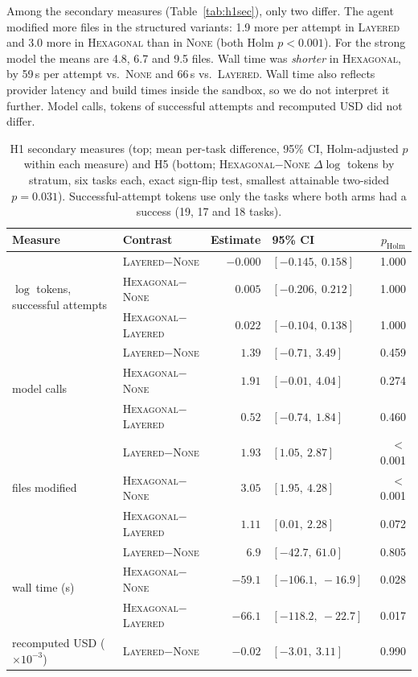 \documentclass[10pt]{article}
\newcommand{\NONE}{\textsc{None}}
\newcommand{\LAY}{\textsc{Layered}}
\newcommand{\HEX}{\textsc{Hexagonal}}
\begin{document}
Among the secondary measures (Table~\ref{tab:h1sec}), only two differ. The agent modified more
files in the structured variants: 1.9 more per attempt in \LAY{} and 3.0 more in \HEX{} than in
\NONE{} (both Holm $p<0.001$). For the strong model the means are 4.8, 6.7 and 9.5 files. Wall
time was \emph{shorter} in \HEX, by 59\,s per attempt vs.\ \NONE{} and 66\,s vs.\ \LAY. Wall time
also reflects provider latency and build times inside the sandbox, so we do not interpret it
further. Model calls, tokens of successful attempts and recomputed USD did not differ.

\begin{table}[tbp]\centering
\caption{H1 secondary measures (top; mean per-task difference, 95\% CI, Holm-adjusted $p$ within
each measure) and H5 (bottom; \HEX$-$\NONE{} $\Delta\log$ tokens by stratum, six tasks each, exact
sign-flip test, smallest attainable two-sided $p=0.031$). Successful-attempt tokens use only the
tasks where both arms had a success (19, 17 and 18 tasks).}
\label{tab:h1sec}\label{tab:h5}
\footnotesize
\begin{tabular}{@{}llrlr@{}}
\toprule
Measure & Contrast & Estimate & 95\% CI & $p_\text{Holm}$\\
\midrule
\multirow{3}{*}{$\log$ tokens, successful attempts} & \LAY$-$\NONE & $-0.000$ & $[-0.145,\ 0.158]$ & 1.000\\
 & \HEX$-$\NONE & $0.005$ & $[-0.206,\ 0.212]$ & 1.000\\
 & \HEX$-$\LAY & $0.022$ & $[-0.104,\ 0.138]$ & 1.000\\
\midrule
\multirow{3}{*}{model calls} & \LAY$-$\NONE & $1.39$ & $[-0.71,\ 3.49]$ & 0.459\\
 & \HEX$-$\NONE & $1.91$ & $[-0.01,\ 4.04]$ & 0.274\\
 & \HEX$-$\LAY & $0.52$ & $[-0.74,\ 1.84]$ & 0.460\\
\midrule
\multirow{3}{*}{files modified} & \LAY$-$\NONE & $1.93$ & $[1.05,\ 2.87]$ & $<$0.001\\
 & \HEX$-$\NONE & $3.05$ & $[1.95,\ 4.28]$ & $<$0.001\\
 & \HEX$-$\LAY & $1.11$ & $[0.01,\ 2.28]$ & 0.072\\
\midrule
\multirow{3}{*}{wall time (s)} & \LAY$-$\NONE & $6.9$ & $[-42.7,\ 61.0]$ & 0.805\\
 & \HEX$-$\NONE & $-59.1$ & $[-106.1,\ -16.9]$ & 0.028\\
 & \HEX$-$\LAY & $-66.1$ & $[-118.2,\ -22.7]$ & 0.017\\
\midrule
\multirow{3}{*}{recomputed USD ($\times 10^{-3}$)} & \LAY$-$\NONE & $-0.02$ & $[-3.01,\ 3.11]$ & 0.990\\

\end{tabular}
\end{table}
\end{document}
